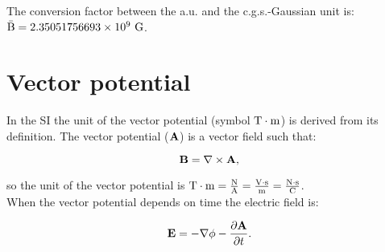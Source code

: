 \documentclass[12pt,a4paper,twoside]{report}
\def\toverg{9.99999999726\times 10^{3}}
\def\barbcgs{2.35051756693\times 10^{9}}
\begin{document}
{%

{\color{green} 
The conversion factor between the a.u. and the c.g.s.-Gaussian unit is: 
${\rm \bar B} = \barbcgs\ {\rm G}$.
}

\newpage
{\color{coral}\section{Vector potential}}
\color{black}

In the SI the unit of the vector potential (symbol ${\rm T} \cdot {\rm m}$)
is derived from its definition. The vector potential (${\bf A}$)
is a vector field such that:

\begin{tcolorbox}
\begin{equation}
{\bf B}=\nabla \times {\bf A},
\label{defav}
\end{equation}
\end{tcolorbox}

so the unit of the vector potential is ${\rm T}\cdot {\rm m}={{\rm N} \over {\rm A}}=
{{\rm V}\cdot {\rm s} \over {\rm m}}={{\rm N}\cdot {\rm s} \over {\rm C}}$. \\
When the vector potential depends on time the electric field is:

\begin{tcolorbox}
\begin{equation}
{\bf E}=-\nabla \phi -{\partial {\bf A} \over \partial t}.
\label{ephia}
\end{equation}
\end{tcolorbox}

}
\end{document}
